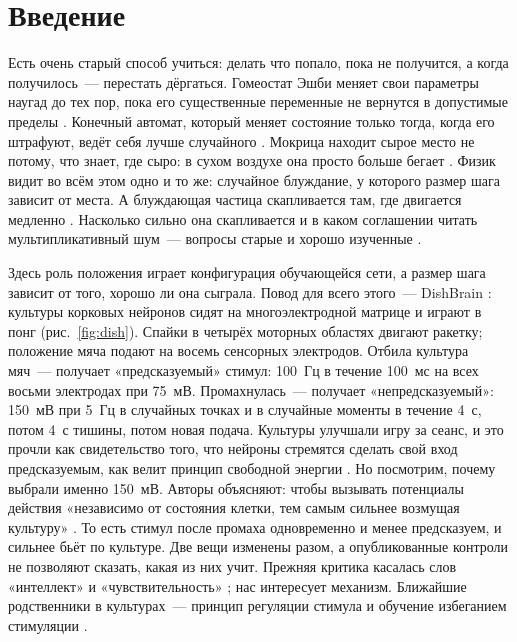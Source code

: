 \documentclass[pre,twocolumn,superscriptaddress,showpacs=false,amsmath,amssymb,nofootinbib]{revtex4-2}
\begin{document}
\maketitle

\section{Введение}

Есть очень старый способ учиться: делать что попало, пока не получится, а когда получилось~--- перестать дёргаться. Гомеостат Эшби меняет свои параметры наугад до тех пор, пока его существенные переменные не вернутся в допустимые пределы \cite{Ashby1952}. Конечный автомат, который меняет состояние только тогда, когда его штрафуют, ведёт себя лучше случайного \cite{Tsetlin1961,Tsetlin1963,Robbins1952}. Мокрица находит сырое место не потому, что знает, где сыро: в сухом воздухе она просто больше бегает \cite{Gunn1937}. Физик видит во всём этом одно и то же: случайное блуждание, у которого размер шага зависит от места. А блуждающая частица скапливается там, где двигается медленно \cite{Schnitzer1993,vanKampen1988,Landauer1988}. Насколько сильно она скапливается и в каком соглашении читать мультипликативный шум~--- вопросы старые и хорошо изученные \cite{Volpe2016}.

Здесь роль положения играет конфигурация обучающейся сети, а размер шага зависит от того, хорошо ли она сыграла. Повод для всего этого~--- DishBrain \cite{Kagan2022}: культуры корковых нейронов сидят на многоэлектродной матрице и играют в понг (рис.~\ref{fig:dish}). Спайки в четырёх моторных областях двигают ракетку; положение мяча подают на восемь сенсорных электродов. Отбила культура мяч~--- получает «предсказуемый» стимул: 100~Гц в течение 100~мс на всех восьми электродах при 75~мВ. Промахнулась~--- получает «непредсказуемый»: 150~мВ при 5~Гц в случайных точках и в случайные моменты в течение 4~с, потом 4~с тишины, потом новая подача. Культуры улучшали игру за сеанс, и это прочли как свидетельство того, что нейроны стремятся сделать свой вход предсказуемым, как велит принцип свободной энергии \cite{Friston2010,Kagan2022}. Но посмотрим, почему выбрали именно 150~мВ. Авторы объясняют: чтобы вызывать потенциалы действия «независимо от состояния клетки, тем самым сильнее возмущая культуру» \cite{Kagan2022}. То есть стимул после промаха одновременно и менее предсказуем, и сильнее бьёт по культуре. Две вещи изменены разом, а опубликованные контроли не позволяют сказать, какая из них учит. Прежняя критика касалась слов «интеллект» и «чувствительность» \cite{Balci2023,Kagan2023reply}; нас интересует механизм. Ближайшие родственники в культурах~--- принцип регуляции стимула \cite{Shahaf2001,Marom2002} и обучение избеганием стимуляции \cite{Sinapayen2017,Masumori2020}.
\end{document}
